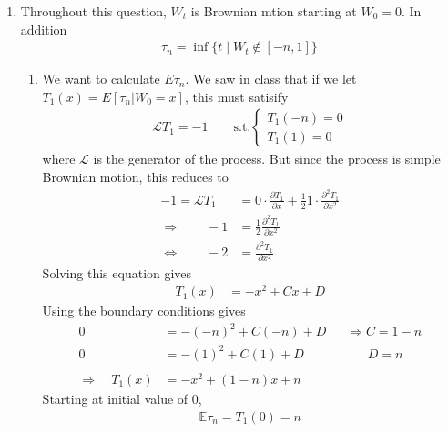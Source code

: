 \documentclass[12pt]{article}
\theoremstyle{plain}
\theoremstyle{definition}
\theoremstyle{remark}
\begin{document}
\begin{enumerate}
  \item %
    Throughout this question, $W_t$ is Brownian mtion starting at
    $W_0=0$. In addition
    \begin{align*}
      \tau_n = \inf \{t \; | \; W_t \not\in [-n,1]\}
    \end{align*}
    \begin{enumerate}
      \item %
        We want to calculate $E\tau_n$. We saw in class that if we let
        $T_1(x) = E[\tau_n | W_0=x]$, this must satisify
        \begin{align*}
          \mathscr{L}T_1 = -1
          \qquad \text{s.t.}
          \begin{cases}
            T_1(-n) = 0 \\
            T_1(1)=0
          \end{cases}
        \end{align*}
        where $\mathscr{L}$ is the generator of the process. But since
        the process is simple Brownian motion, this reduces to
        \begin{align*}
          -1 = \mathscr{L}T_1
          &= 0 \cdot \frac{\partial T_1}{\partial x}
          + \frac{1}{2} 1\cdot \frac{\partial^2 T_1}{\partial x^2}\\
          \Rightarrow\qquad
          -1 &= \frac{1}{2} \frac{\partial^2 T_1}{\partial x^2}\\
          \Leftrightarrow\qquad
          -2 &= \frac{\partial^2 T_1}{\partial x^2}
        \end{align*}
        Solving this equation gives
        \begin{align*}
          T_1(x) &= -x^2 + Cx + D
        \end{align*}
        Using the boundary conditions gives
        \begin{align*}
          0 &= -(-n)^2 + C(-n) + D
          \;\;\quad \Rightarrow
          C = 1-n\\
          0 &= -(1)^2 + C(1) + D \quad\qquad\qquad
          D = n\\\\
          \Rightarrow \quad
          T_1(x) &= -x^2 + (1-n)x + n
        \end{align*}
        Starting at initial value of 0,
        \begin{align*}
          \mathbb{E}\tau_n = T_1(0) = n
        \end{align*}


\end{enumerate}
\end{enumerate}
\end{document}
